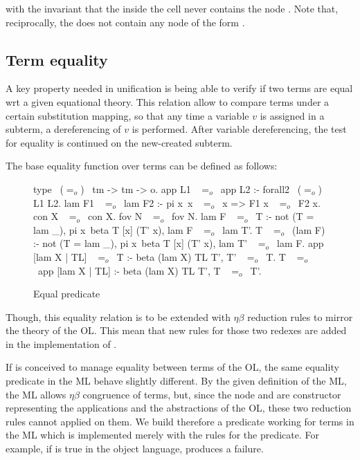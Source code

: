 \documentclass[sigconf,natbib=false]{acmart}
\newcommand{\EqualRel}{\ensuremath{=}}
\newcommand{\Eo}{\ensuremath{\EqualRel_o}\xspace}
\begin{document}
\noindent
with the invariant that the  inside the cell never contains the node
. Note that, reciprocally, the  does not contain
any node of the form .

\subsection{Term equality}

\old

A key property needed in unification is being able to verify if two terms are
equal wrt a given equational theory. This relation allow to compare terms under
a certain substitution mapping, so that any time a variable $v$ is assigned in a
subterm, a dereferencing of $v$ is performed. After variable dereferencing, the
test for equality is continued on the new-created subterm.

The base equality function over terms can be defined as follows:

\begin{figure}
  \begin{elpicode}
    type ~(\Eo)~ tm -> tm -> o.
    app L1 ~\Eo~app L2 :- forall2 ~(\Eo)~ L1 L2.
    lam F1 ~\Eo~lam F2 :- pi x\ x ~\Eo~x => F1 x ~\Eo~F2 x.
    con X ~\Eo~con X.
    fov N ~\Eo~fov N.
    lam F ~\Eo~T :- not (T = lam _), 
      pi x\ beta T [x] (T' x), lam F ~\Eo~lam T'.
    T ~\Eo~(lam F) :- not (T = lam _), 
      pi x\ beta T [x] (T' x), lam T' ~\Eo~lam F.
    app [lam X | TL] ~\Eo~T :- beta (lam X) TL T', T' ~\Eo~T.
    T ~\Eo~app [lam X | TL] :- beta (lam X) TL T', T ~\Eo~T'.
  \end{elpicode}
  \caption{Equal predicate}
  \label{code:eq-pred}
\end{figure}

Though, this equality relation is to be extended with $\eta\beta$ reduction
rules to mirror the theory of the OL. This mean
that new rules for those two redexes are added in the implementation of
.

If  is conceived to manage equality between terms of the OL,
the same equality predicate in the ML behave slightly different. By the given
definition of the ML, the ML allows $\eta\beta$ congruence of terms, but, since
the node  and  are constructor representing the
applications and the abstractions of the OL, these two reduction rules cannot
applied on them. We build therefore a predicate  working for terms
in the ML which is implemented merely with the rules for the 
predicate. For example, if  is true in the object language,  produces a failure.
\end{document}
